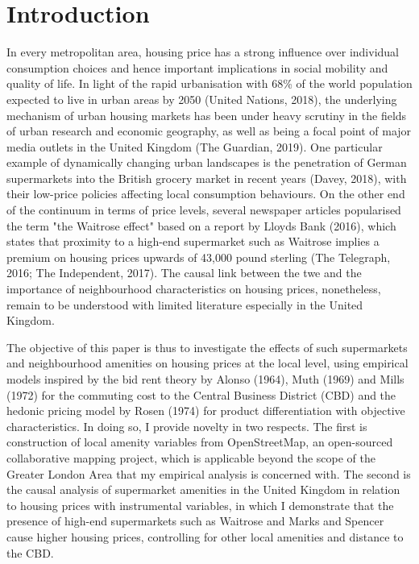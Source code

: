 \documentclass{article}
\begin{document}
\section{Introduction} \label{section:intro}
In every metropolitan area, housing price has a strong influence over individual consumption choices and hence important implications in social mobility and quality of life. In light of the rapid urbanisation with 68\% of the world population expected to live in urban areas by 2050 (United Nations, 2018), the underlying mechanism of urban housing markets has been under heavy scrutiny in the fields of urban research and economic geography, as well as being a focal point of major media outlets in the United Kingdom (The Guardian, 2019). One particular example of dynamically changing urban landscapes is the penetration of German supermarkets into the British grocery market in recent years (Davey, 2018), with their low-price policies affecting local consumption behaviours. On the other end of the continuum in terms of price levels, several newspaper articles popularised the term "the Waitrose effect" based on a report by Lloyds Bank (2016), which states that proximity to a high-end supermarket such as Waitrose implies a premium on housing prices upwards of 43,000 pound sterling (The Telegraph, 2016; The Independent, 2017). The causal link between the twe and the importance of neighbourhood characteristics on housing prices, nonetheless, remain to be understood with limited literature especially in the United Kingdom. 

The objective of this paper is thus to investigate the effects of such supermarkets and neighbourhood amenities on housing prices at the local level, using empirical models inspired by the bid rent theory by Alonso (1964), Muth (1969) and Mills (1972) for the commuting cost to the Central Business District (CBD) and the hedonic pricing model by Rosen (1974) for product differentiation with objective characteristics. In doing so, I provide novelty in two respects. The first is construction of local amenity variables from OpenStreetMap, an open-sourced collaborative mapping project, which is applicable beyond the scope of the Greater London Area that my empirical analysis is concerned with. The second is the causal analysis of supermarket amenities in the United Kingdom in relation to housing prices with instrumental variables, in which I demonstrate that the presence of high-end supermarkets such as Waitrose and Marks and Spencer cause higher housing prices, controlling for other local amenities and distance to the CBD.
\end{document}
